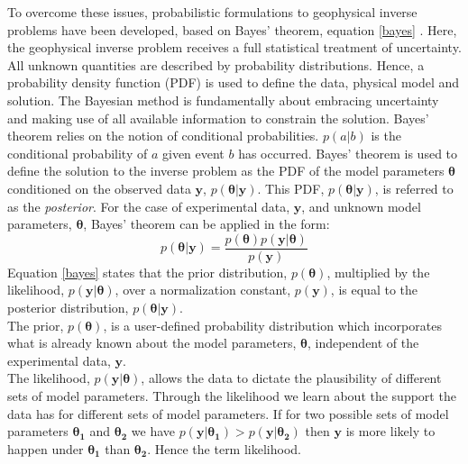 To overcome these issues, probabilistic formulations to geophysical inverse problems have been developed, based on Bayes' theorem, equation \ref{bayes} \citep{Tarantola1982a,Mosegaard1995,Mosegaard2002,Tarantola2005}. Here, the geophysical inverse problem receives a full statistical treatment of uncertainty. All unknown quantities are described by probability distributions. Hence, a probability density function (PDF) is used to define the data, physical model and solution. The Bayesian method is fundamentally about embracing uncertainty and making use of all available information to constrain the solution. Bayes' theorem relies on the notion of conditional probabilities. $p(a|b)$ is the conditional probability of $a$ given event $b$ has occurred. Bayes' theorem is used to define the solution to the inverse problem as the PDF of the model parameters $\bm{\theta}$ conditioned on the observed data $\bm{y}$, $p(\bm{\theta}|\bm{y})$. This PDF, $p(\bm{\theta}|\bm{y})$, is referred to as the \textit{posterior}. For the case of experimental data, $\bm{y}$, and unknown model parameters, $\bm{\theta}$, Bayes' theorem can be applied in the form:
\begin{equation}
p(\bm{\theta}|\bm{y}) = \frac{p(\bm{\theta}) p(\bm{y}|\bm{\theta})}{p(\bm{y})}
\label{bayes}
\end{equation}
Equation \ref{bayes} states that the prior distribution, $p(\bm{\theta})$, multiplied by the likelihood, $p(\bm{y}|\bm{\theta})$, over a normalization constant, $p(\bm{y})$, is equal to the posterior distribution, $p(\bm{\theta}|\bm{y})$. \\

The prior, $p(\bm{\theta})$, is a user-defined probability distribution which incorporates what is already known about the model parameters, $\bm{\theta}$, independent of the experimental data, $\bm{y}$.\\

The likelihood, $p(\bm{y}|\bm{\theta})$, allows the data to dictate the plausibility of different sets of model parameters. Through the likelihood we learn about the support the data has for different sets of model parameters. If for two possible sets of model parameters $\bm{\theta_1}$ and $\bm{\theta_2}$ we have $p(\bm{y}|\bm{\theta_1}) > p(\bm{y}|\bm{\theta_2})$ then $\bm{y}$ is more likely to happen under $\bm{\theta_1}$ than $\bm{\theta_2}$. Hence the term likelihood.\\

